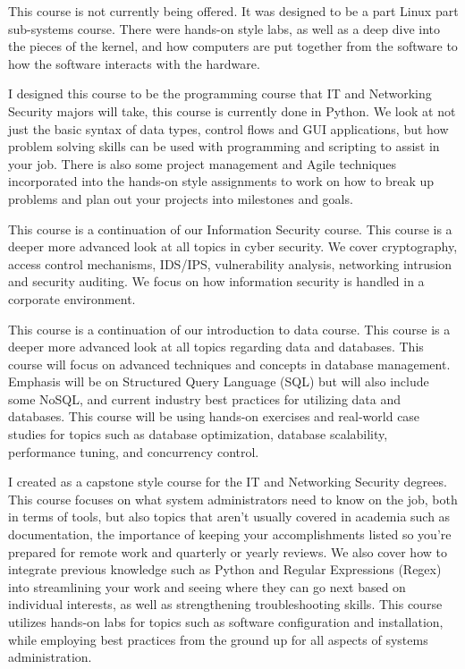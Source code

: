{
{This course is not currently being offered.  It was designed to be a part Linux part sub-systems course. There were hands-on style labs, as well as a deep dive into the pieces of the kernel, and how computers are put together from the software to how the software interacts with the hardware. }

{I designed this course to be the programming course that IT and Networking Security majors will take, this course is currently done in Python.  We look at not just the basic syntax of data types, control flows and GUI applications, but how problem solving skills can be used with programming and scripting to assist in your job.  There is also some project management and Agile techniques incorporated into the hands-on style assignments to work on how to break up problems and plan out your projects into milestones and goals.}

{This course is a continuation of our Information Security course.  This course is a deeper more advanced look at all topics in cyber security.  We cover cryptography, access control mechanisms, IDS/IPS, vulnerability analysis, networking intrusion and security auditing.  We focus on how information security is handled in a corporate environment.}

{This course is a continuation of our introduction to data course.  This course is a deeper more advanced look at all topics regarding data and databases.  This course will focus on advanced techniques and concepts in database management. Emphasis will be on Structured Query Language (SQL)  but will also include some NoSQL, and current industry best practices for utilizing data and databases. This course will be using hands-on exercises and real-world case studies for topics such as database optimization, database scalability, performance tuning, and concurrency control.}

{I created as a capstone style course for the IT and Networking Security degrees.  This course focuses on what system administrators need to know on the job, both in terms of tools, but also topics that aren’t usually covered in academia such as documentation, the importance of keeping your accomplishments listed so you're prepared for remote work and quarterly or yearly reviews. We also cover how to integrate previous knowledge such as Python and Regular Expressions (Regex) into streamlining your work and seeing where they can go next based on individual interests, as well as strengthening troubleshooting skills. This course utilizes hands-on labs for topics such as software configuration and installation, while employing best practices from the ground up for all aspects of systems administration. }


}
